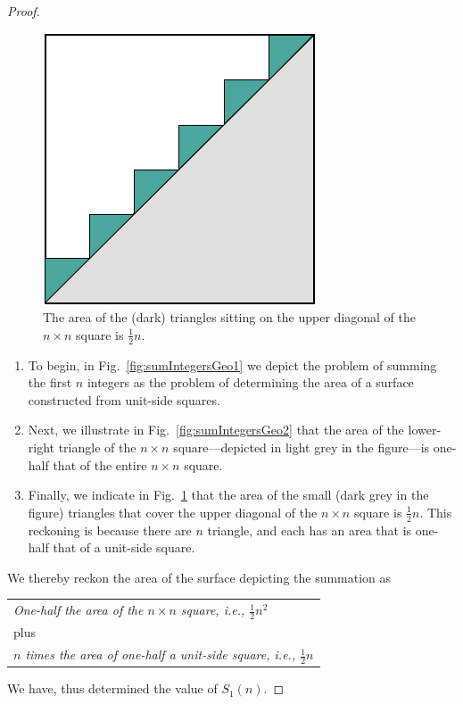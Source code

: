 \begin{proof}
\begin{figure}[h]
\begin{center}
       \includegraphics[scale=0.4]{FiguresMaths/SumIntegersGeometricFinal}
\caption{The area of the (dark) triangles sitting on the upper
  diagonal of the $n \times n$ square is $\frac{1}{2} n$.}
       \label{fig:sumIntegersGeo3}
\end{center}
\end{figure}
\begin{enumerate}
\item
To begin, in Fig.~\ref{fig:sumIntegersGeo1} we depict the problem of
summing the first $n$ integers as the problem of determining the area
of a surface constructed from unit-side squares.

\item
Next, we illustrate in Fig.~\ref{fig:sumIntegersGeo2} that the area of
the lower-right triangle of the $n \times n$ square---depicted in
light grey in the figure---is one-half that of the entire $n \times n$
square.

\item
Finally, we indicate in Fig.~\ref{fig:sumIntegersGeo3} that the area
of the small (dark grey in the figure) triangles that cover the upper
diagonal of the $n \times n$ square is $\frac{1}{2} n$.  This
reckoning is because there are $n$ triangle, and each has an area that
is one-half that of a unit-side square.
\end{enumerate}
We thereby reckon the area of the surface depicting the summation as

\begin{tabular}{l}
{\it One-half the area of the $n \times n$ square,
i.e., $\frac{1}{2} n^2$} \\
\hspace*{.15in} plus   \\
{\it $n$ times the area of one-half a unit-side square,
i.e., $\frac{1}{2} n$}
\end{tabular}

\noindent
We have, thus determined the value of $S_1(n)$.
\end{proof}

